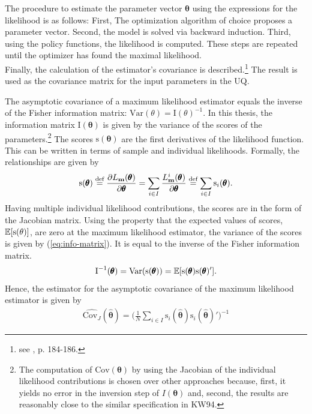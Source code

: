 The procedure to estimate the parameter vector $\pmb{\theta}$ using the expressions for the likelihood is as follows: First, The optimization algorithm of choice proposes a parameter vector. Second, the model is solved via backward induction. Third, using the policy functions, the likelihood is computed. These steps are repeated until the optimizer has found the maximal likelihood. 
\\

Finally, the calculation of the estimator's covariance is described.\footnote{see \cite{Verbeek.2012}, p. 184-186.} The result is used as the covariance matrix for the input parameters in the UQ.

The asymptotic covariance of a maximum likelihood estimator equals the inverse of the Fisher information matrix: $\text{Var}(\theta)=\text{I}(\theta)^{-1}$. In this thesis, the information matrix $\text{I}(\pmb{\theta})$ is given by the variance of the scores of the parameters.\footnote{The computation of $\text{Cov}(\pmb{\theta})$ by using the Jacobian of the individual likelihood contributions is chosen over other approaches because, first, it yields no error in the inversion step of $I(\pmb{\theta})$ and, second, the results are reasonably close to the similar specification in KW94.} The scores $\text{s}(\pmb{\theta})$ are the first derivatives of the likelihood function. This can be written in terms of sample and individual likelihoods. Formally, the relationships are given by
\begin{align} \label{eq:scores}
\text{s}(\pmb{\theta}) \stackrel{\text{def}}{=} \frac{\partial L_{\bold{m}}({\pmb{\theta}})} {\partial \pmb{\theta}} = \sum_{i \in I} \frac{L_{\bold{m}}^{i}(\pmb{\theta})}{\partial \pmb{\theta}} \stackrel{\text{def}}{=} \sum_{i \in I}\text{s}_i(\pmb{\theta}).
\end{align}
Having multiple individual likelihood contributions, the scores are in the form of the  Jacobian matrix.
Using the property that the expected values of scores, $\operatorname*{\mathbb{E}}[\text{s}(\theta)]$, are zero at the maximum likelihood estimator, the variance of the scores is given by (\ref{eq:info-matrix}). It is equal to the inverse of the Fisher information matrix.
\begin{align} \label{eq:info-matrix}
\text{I}^{-1}(\pmb{\theta}) = \text{Var}(\text{s}(\pmb{\theta})) = \operatorname*{\mathbb{E}}[\text{s}(\pmb{\theta})\text{s}(\pmb{\theta})'].
\end{align}
Hence, the estimator for the asymptotic covariance of the maximum likelihood estimator is given by
\begin{align} \label{eq:est-cov}
\hat{\text{Cov}_J}(\pmb{\hat{\theta}}) = \bigg( \frac{1}{N} \sum_{i \in I} \text{s}_i(\pmb{\hat{\theta}})\text{s}_i(\pmb{\hat{\theta}})' \bigg)^{-1}
\end{align}
